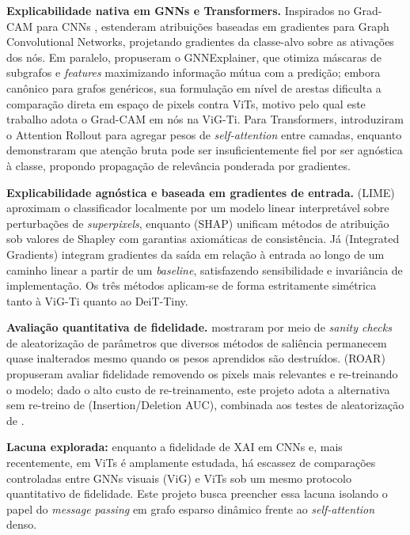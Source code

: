 \documentclass{article}
\begin{document}
\textbf{Explicabilidade nativa em GNNs e Transformers.} Inspirados no Grad-CAM para CNNs \citep{selvaraju2017gradcam}, \citet{pope2019gnn} estenderam atribuições baseadas em gradientes para Graph Convolutional Networks, projetando gradientes da classe-alvo sobre as ativações dos nós. Em paralelo, \citet{ying2019gnnexplainer} propuseram o GNNExplainer, que otimiza máscaras de subgrafos e \textit{features} maximizando informação mútua com a predição; embora canônico para grafos genéricos, sua formulação em nível de arestas dificulta a comparação direta em espaço de pixels contra ViTs, motivo pelo qual este trabalho adota o Grad-CAM em nós na ViG-Ti. Para Transformers, \citet{abnar2020rollout} introduziram o Attention Rollout para agregar pesos de \textit{self-attention} entre camadas, enquanto \citet{chefer2021transformer} demonstraram que atenção bruta pode ser insuficientemente fiel por ser agnóstica à classe, propondo propagação de relevância ponderada por gradientes.

\textbf{Explicabilidade agnóstica e baseada em gradientes de entrada.} \citet{ribeiro2016lime} (LIME) aproximam o classificador localmente por um modelo linear interpretável sobre perturbações de \textit{superpixels}, enquanto \citet{lundberg2017shap} (SHAP) unificam métodos de atribuição sob valores de Shapley com garantias axiomáticas de consistência. Já \citet{sundararajan2017ig} (Integrated Gradients) integram gradientes da saída em relação à entrada ao longo de um caminho linear a partir de um \textit{baseline}, satisfazendo sensibilidade e invariância de implementação. Os três métodos aplicam-se de forma estritamente simétrica tanto à ViG-Ti quanto ao DeiT-Tiny.

\textbf{Avaliação quantitativa de fidelidade.} \citet{adebayo2018sanity} mostraram por meio de \textit{sanity checks} de aleatorização de parâmetros que diversos métodos de saliência permanecem quase inalterados mesmo quando os pesos aprendidos são destruídos. \citet{hooker2019roar} (ROAR) propuseram avaliar fidelidade removendo os pixels mais relevantes e re-treinando o modelo; dado o alto custo de re-treinamento, este projeto adota a alternativa sem re-treino de \citet{petsiuk2018rise} (Insertion/Deletion AUC), combinada aos testes de aleatorização de \citet{adebayo2018sanity}.

\textbf{Lacuna explorada:} enquanto a fidelidade de XAI em CNNs e, mais recentemente, em ViTs é amplamente estudada, há escassez de comparações controladas entre GNNs visuais (ViG) e ViTs sob um mesmo protocolo quantitativo de fidelidade. Este projeto busca preencher essa lacuna isolando o papel do \textit{message passing} em grafo esparso dinâmico frente ao \textit{self-attention} denso.
\end{document}
